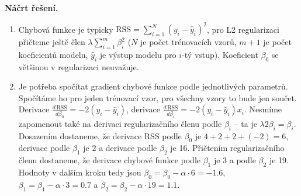 \medskip
\noindent\textbf{Náčrt řešení.}\par
\begin{enumerate}
  \item Chybová funkce je typicky $\mathrm{RSS} = \sum_{i=1}^{N} (y_i - \hat{y}_i)^2$, pro L2
    regularizaci přičteme ještě člen $\lambda \sum_{i=1}^{m} \beta_i^2$ ($N$ je počet trénovacích
    vzorů, $m+1$ je počet koeficientů modelu, $\hat{y}_i$ je výstup modelu pro $i$-tý vstup).
    Koeficient $\beta_0$ se většinou v regularizaci neuvažuje.
  \item Je potřeba spočítat gradient chybové funkce podle jednotlivých parametrů. Spočítáme ho
    pro jeden trénovací vzor, pro všechny vzory to bude jen součet. Derivace
    $\frac{d\,\mathrm{RSS}}{d\beta_0} = -2(y_i - \hat{y}_i)$, derivace
    $\frac{d\,\mathrm{RSS}}{d\beta_i} = -2(y_i - \hat{y}_i) x_i$. Nesmíme zapomenout také na
    derivaci regularizačního členu podle $\beta_i$ -- ta je $\lambda 2 \beta_i = \beta_i$.
    Dosazením dostaneme, že derivace RSS podle $\beta_0$ je $4 + 2 + 2 + (-2) = 6$, derivace
    podle $\beta_1$ je 2 a derivace podle $\beta_2$ je 16. Přičtením regularizačního členu
    dostaneme, že derivace chybové funkce podle $\beta_1$ je 3 a podle $\beta_2$ je 19. Hodnoty
    v dalším kroku tedy jsou $\beta_0 = \beta_0 - \alpha \cdot 6 = -1.6$,
    $\beta_1 = \beta_1 - \alpha \cdot 3 = 0.7$ a $\beta_2 = \beta_2 - \alpha \cdot 19 = 1.1$.
\end{enumerate}
